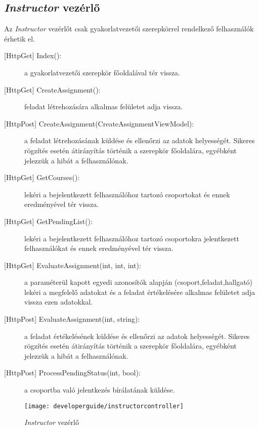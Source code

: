 \subsection{\emph{Instructor} vezérlő}
Az \emph{Instructor} vezérlőt csak gyakorlatvezetői szerepkörrel rendelkező felhasználók érhetik el.
\begin{description}
	\item[{[HttpGet]} Index():] a gyakorlatvezetői szerepkör főoldalával tér vissza.
	\item[{[HttpGet]} CreateAssignment():] feladat létrehozására alkalmas felületet adja vissza.
	\item[{[HttpPost]} CreateAssignment(CreateAssignmentViewModel):] a feladat létrehozásának küldése és ellenőrzi az adatok helyességét. Sikeres rögzítés esetén átirányítás történik a szerepkör főoldalára, egyébként jelezzük a hibát a felhasználónak.
	\item[{[HttpGet]} GetCourses():] lekéri a bejelentkezett felhasználóhoz tartozó csoportokat és ennek eredményével tér vissza.
	\item[{[HttpGet]} GetPendingList():] lekéri a bejelentkezett felhasználóhoz tartozó csoportokra jelentkezett felhasználókat és ennek eredményével tér vissza.
	\item[{[HttpGet]} EvaluateAssignment(int, int, int):] a paraméterül kapott egyedi azonosítók alapján (csoport,feladat,hallgató) lekéri a megfelelő adatokat és a feladat értékelésére alkalmas felületet adja vissza ezen adatokkal.
	\item[{[HttpPost]} EvaluateAssignment(int, string):] a feladat értékelésének küldése és ellenőrzi az adatok helyességét. Sikeres rögzítés esetén átirányítás történik a szerepkör főoldalára, egyébként jelezzük a hibát a felhasználónak.
	\item[{[HttpPost]} ProcessPendingStatus(int, bool):] a csoportba való jelentkezés bírálatának küldése.
\end{description}
\begin{figure}[H]
	\centering
	\texttt{[image: developerguide/instructorcontroller]}
	\caption{\emph{Instructor} vezérlő}
	\label{fig:instructorcontroller}
\end{figure}

